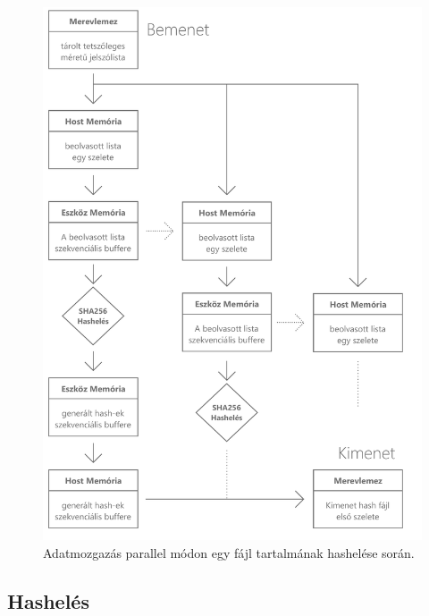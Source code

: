 \begin{figure}[H]
    \centering 
    \includegraphics[width=\textwidth]{images/pdf/data-movement-parallel.pdf}
    \caption{Adatmozgazás parallel módon egy fájl tartalmának hashelése során.}
    \label{fig:parallelgpu}
\end{figure}



\subsection{Hashelés}

